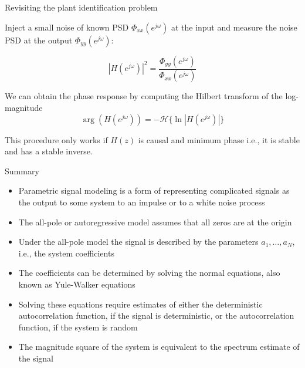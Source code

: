 \documentclass[10pt, aspectratio=169]{beamer}
\begin{document}
\begin{frame}{Revisiting the plant identification problem}
	
\begin{center}
\end{center}

Inject a small noise of known PSD $\Phi_{xx}(e^{j\omega})$ at the input and measure the noise PSD at the output $\Phi_{yy}(e^{j\omega})$:

\begin{equation*}
|H(e^{j\omega})|^2 = \frac{\Phi_{yy}(e^{j\omega})}{\Phi_{xx}(e^{j\omega})} \tag{only know the magnitude}
\end{equation*}

We can obtain the phase response by computing the Hilbert transform of the log-magnitude
\begin{equation*}
\arg(H(e^{j\omega})) = -\mathcal{H}\{\ln |H(e^{j\omega})|\}
\end{equation*}

This procedure only works if $H(z)$ is causal and minimum phase i.e., it is stable and has a stable inverse.

\end{frame}

%
\begin{frame}{Summary}
	\begin{itemize}
		\item Parametric signal modeling is a form of representing complicated signals as the output to some system to an impulse or to a white noise process
		\item The all-pole or autoregressive model assumes that all zeros are at the origin
		\item Under the all-pole model the signal is described by the parameters $a_1, \ldots, a_N$, i.e., the system coefficients
		\item The coefficients can be determined by solving the normal equations, also known as Yule-Walker equations
		\item Solving these equations require estimates of either the deterministic autocorrelation function, if the signal is deterministic, or the autocorrelation function, if the system is random
		\item The magnitude square of the system is equivalent to the spectrum estimate of the signal
	\end{itemize}
\end{frame}
\end{document}
